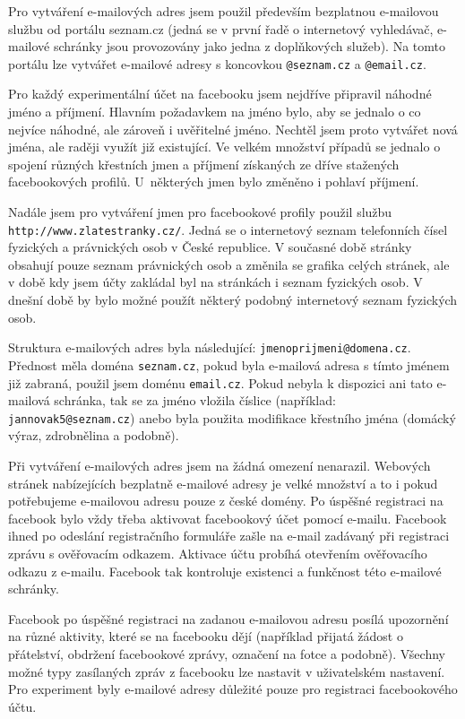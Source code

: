 \documentclass[thesis=M,czech]{FITthesis}[2013/05/10]
\begin{document}
Pro vytváření e-mailových adres jsem použil především bezplatnou e-mailovou službu od portálu seznam.cz (jedná se v první řadě o internetový vyhledávač, e-mailové schránky jsou provozovány jako jedna z doplňkových služeb). Na tomto portálu lze vytvářet e-mailové adresy s koncovkou \verb|@seznam.cz| a \verb|@email.cz|.

Pro každý experimentální účet na facebooku jsem nejdříve připravil náhodné jméno a příjmení. Hlavním požadavkem na jméno bylo, aby se jednalo o co nejvíce náhodné, ale zároveň i uvěřitelné jméno. Nechtěl jsem proto vytvářet nová jména, ale raději využít již existující. Ve velkém množství případů se jednalo o spojení různých křestních jmen a příjmení získaných ze dříve stažených facebookových profilů. U~některých jmen bylo změněno i pohlaví příjmení. 

Nadále jsem pro vytváření jmen pro facebookové profily použil službu \verb|http://www.zlatestranky.cz/|. Jedná se o internetový seznam telefonních čísel fyzických a právnických osob v České republice. V současné době stránky obsahují pouze seznam právnických osob a změnila se grafika celých stránek, ale v době kdy jsem účty zakládal byl na stránkách i seznam fyzických osob. V dnešní době by bylo možné použít některý podobný internetový seznam fyzických osob.

Struktura e-mailových adres byla následující: \verb|jmenoprijmeni@domena.cz|. Přednost měla doména \verb|seznam.cz|, pokud byla e-mailová adresa s tímto jménem již zabraná, použil jsem doménu \verb|email.cz|. Pokud nebyla k dispozici ani tato e-mailová schránka, tak se za jméno vložila číslice (například: \verb|jannovak5@seznam.cz|) anebo byla použita modifikace křestního jména (domácký výraz, zdrobnělina a podobně).

Při vytváření e-mailových adres jsem na žádná omezení nenarazil. Webových stránek nabízejících bezplatně e-mailové adresy je velké množství a to i pokud potřebujeme e-mailovou adresu pouze z české domény. Po úspěšné registraci na facebook bylo vždy třeba aktivovat facebookový účet pomocí e-mailu. Facebook ihned po odeslání registračního formuláře zašle na e-mail zadávaný při registraci zprávu s ověřovacím odkazem. Aktivace účtu probíhá otevřením ověřovacího odkazu z e-mailu. Facebook tak kontroluje existenci a funkčnost této e-mailové schránky.

Facebook po úspěšné registraci na zadanou e-mailovou adresu posílá upozornění na různé aktivity, které se na facebooku dějí (například přijatá žádost o přátelství, obdržení facebookové zprávy, označení na fotce a podobně). Všechny možné typy zasílaných zpráv z facebooku lze nastavit v uživatelském nastavení. Pro experiment byly e-mailové adresy důležité pouze pro registraci facebookového účtu.
\end{document}
